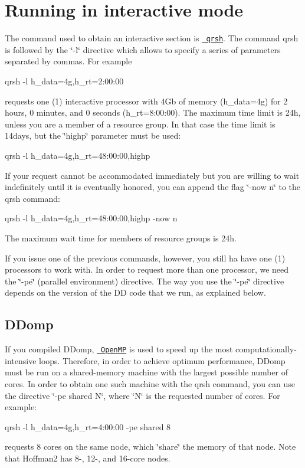 \subparagraph*{}\hypertarget{hoffman2_hoffma2_dd_interactive}{}\section{Running in interactive mode}\label{hoffman2_hoffma2_dd_interactive}
The command used to obtain an interactive section is \href{http://hpc.ucla.edu/hoffman2/computing/sge_qrsh.php}{\texttt{ qrsh}}. The command qrsh is followed by the \char`\"{}-\/l\char`\"{} directive which allows to specify a series of parameters separated by commas. For example \begin{DoxyVerb}qrsh -l h_data=4g,h_rt=2:00:00
\end{DoxyVerb}
 requests one (1) interactive processor with 4Gb of memory (h\+\_\+data=4g) for 2 hours, 0 minutes, and 0 seconds (h\+\_\+rt=8\+:00\+:00). The maximum time limit is 24h, unless you are a member of a resource group. In that case the time limit is 14days, but the \char`\"{}highp\char`\"{} parameter must be used\+: \begin{DoxyVerb}qrsh -l h_data=4g,h_rt=48:00:00,highp
\end{DoxyVerb}
 If your request cannot be accommodated immediately but you are willing to wait indefinitely until it is eventually honored, you can append the flag \char`\"{}-\/now n\char`\"{} to the qrsh command\+: \begin{DoxyVerb}qrsh -l h_data=4g,h_rt=48:00:00,highp -now n
\end{DoxyVerb}
 The maximum wait time for members of resource groups is 24h.

If you issue one of the previous commands, however, you still ha have one (1) processors to work with. In order to request more than one processor, we need the \char`\"{}-\/pe\char`\"{} (parallel environment) directive. The way you use the \char`\"{}-\/pe\char`\"{} directive depends on the version of the DD code that we run, as explained below.

\subparagraph*{}\hypertarget{hoffman2_hoffma2_dd_interactive_DDomp}{}\subsection{D\+Domp}\label{hoffman2_hoffma2_dd_interactive_DDomp}
If you compiled D\+Domp, \href{http://openmp.org}{\texttt{ Open\+MP}} is used to speed up the most computationally-\/intensive loops. Therefore, in order to achieve optimum performance, D\+Domp must be run on a shared-\/memory machine with the largest possible number of cores. In order to obtain one such machine with the qrsh command, you can use the directive \char`\"{}-\/pe shared N\char`\"{}, where \char`\"{}\+N\char`\"{} is the requested number of cores. For example\+: \begin{DoxyVerb}qrsh -l h_data=4g,h_rt=4:00:00 -pe shared 8
\end{DoxyVerb}
 requests 8 cores on the same node, which \char`\"{}share\char`\"{} the memory of that node. Note that Hoffman2 has 8-\/, 12-\/, and 16-\/core nodes.

